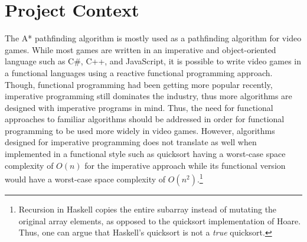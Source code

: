 






\section{Project Context}
The A* pathfinding algorithm is mostly used as a pathfinding algorithm
for video games. While most games are written in an imperative and 
object-oriented language such as C\#, C++, and JavaScript, it is 
possible to write video games in a functional languages
using a reactive functional programming approach.\cite{Cheong2006}
Though, functional programming had been getting more popular recently, imperative programming 
still dominates the industry, thus more algorithms are designed with imperative programs in mind.\cite{CLRS,Skiena,Knuth1997}
Thus, the need for functional approaches to familiar algorithms should be addressed in order 
for functional programming to be used more widely in video games. 
However, algorithms designed for imperative programming does not translate as well when implemented in a 
functional style such as quicksort having a worst-case space complexity of $O(n)$ for the imperative approach 
while its functional version would have a worst-case space complexity of 
$O(n^2)$.\footnote{Recursion in Haskell copies 
the entire subarray instead of mutating the original array elements, 
as opposed to the quicksort implementation of Hoare. Thus, one can 
argue that Haskell's quicksort is not a \emph{true} quicksort.}

